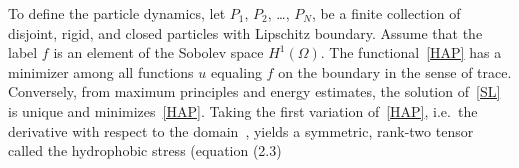 %
%
%
To define the particle dynamics, let $P_1$, $P_2$, \ldots, $P_N$, be a
finite collection of disjoint, rigid, and closed particles with
Lipschitz boundary. Assume that the label $f$ is an element of the
Sobolev space $H^1(\Omega)$. The functional~\eqref{HAP} has a minimizer
among all functions $u$ equaling $f$ on the boundary in the sense of
trace. Conversely, from maximum principles and energy estimates, the
solution of~\eqref{SL} is unique and minimizes~\eqref{HAP}. Taking the
first variation of~\eqref{HAP}, i.e.~the derivative with respect to the
domain~\cite{Bandle2015, Schiffer1954, Grinfeld2010}, yields a
symmetric, rank-two tensor called the hydrophobic stress (equation (2.3)
